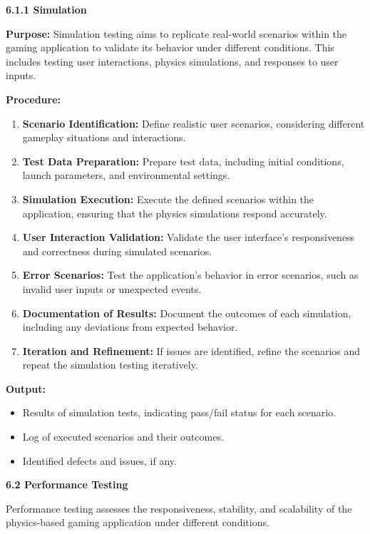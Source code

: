 \documentclass[
]{article}
\begin{document}
\textbf{6.1.1 Simulation}

\textbf{Purpose:} Simulation testing aims to replicate real-world
scenarios within the gaming application to validate its behavior under
different conditions. This includes testing user interactions, physics
simulations, and responses to user inputs.

\textbf{Procedure:}

\begin{enumerate}
\def\labelenumi{\arabic{enumi}.}
\item
  \textbf{Scenario Identification:} Define realistic user scenarios,
  considering different gameplay situations and interactions.
\item
  \textbf{Test Data Preparation:} Prepare test data, including initial
  conditions, launch parameters, and environmental settings.
\item
  \textbf{Simulation Execution:} Execute the defined scenarios within
  the application, ensuring that the physics simulations respond
  accurately.
\item
  \textbf{User Interaction Validation:} Validate the user interface's
  responsiveness and correctness during simulated scenarios.
\item
  \textbf{Error Scenarios:} Test the application's behavior in error
  scenarios, such as invalid user inputs or unexpected events.
\item
  \textbf{Documentation of Results:} Document the outcomes of each
  simulation, including any deviations from expected behavior.
\item
  \textbf{Iteration and Refinement:} If issues are identified, refine
  the scenarios and repeat the simulation testing iteratively.
\end{enumerate}

\textbf{Output:}

\begin{itemize}
\item
  Results of simulation tests, indicating pass/fail status for each
  scenario.
\item
  Log of executed scenarios and their outcomes.
\item
  Identified defects and issues, if any.
\end{itemize}

\protect\hypertarget{Af3}{}{}\textbf{6.2 Performance Testing}

Performance testing assesses the responsiveness, stability, and
scalability of the physics-based gaming application under different
conditions.
\end{document}
